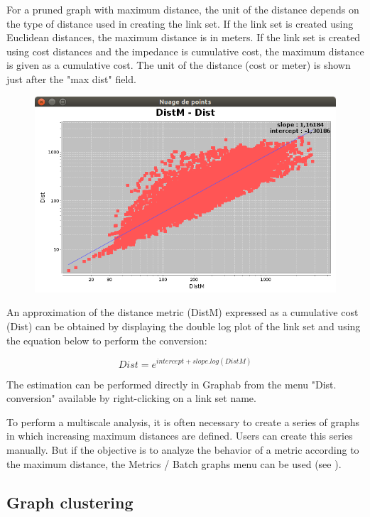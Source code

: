 \documentclass{article}
\begin{document}
For a pruned graph with maximum distance, the unit of the distance depends on the type of distance used in creating the link set. If the link set is created using Euclidean distances, the maximum distance is in meters. If the link set is created using cost distances and the impedance is cumulative cost, the maximum distance is given as a cumulative cost. The unit of the distance (cost or meter) is shown just after the "max dist" field.

\begin{figure}[H]
	\includegraphics[scale=0.5]{img/manual-fr_img7.png}
\end{figure}

An approximation of the distance metric (DistM) expressed as a cumulative cost (Dist) can be obtained by displaying the double log plot of the link set and using the equation below to perform the conversion:

$$Dist = e^{intercept + slope . log(DistM)}$$

The estimation can be performed directly in Graphab from the menu "Dist. conversion" available by right-clicking on a link set name.

To perform a multiscale analysis, it is often necessary to create a series of graphs in which increasing maximum distances are defined. Users can create this series manually. But if the objective is to analyze the behavior of a metric according to the maximum distance, the Metrics / Batch graphs menu can be used (see ).


\subsection{Graph clustering}
\end{document}
